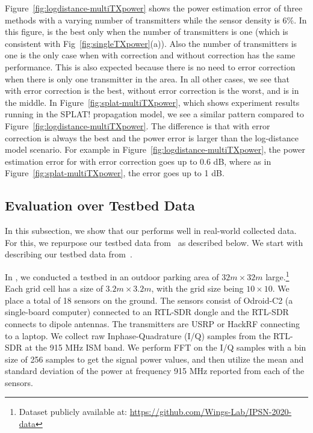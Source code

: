 Figure~\ref{fig:logdistance-multiTXpower} shows the power estimation error of three methods with a varying number of transmitters while the sensor density is 6\%.
In this figure, \map is the best only when the number of transmitters is one (which is consistent with Fig~\ref{fig:singleTXpower}(a)).
Also the number of transmitters is one is the only case when \power with correction and without correction has the same performance.
This is also expected because there is no need to error correction when there is only one transmitter in the area.
In all other cases, we see that \power with error correction is the best, \power without error correction  is the worst, and \map is in the middle.
In Figure~\ref{fig:splat-multiTXpower}, which shows experiment results running in the SPLAT! propagation model, we see a similar pattern compared to Figure~\ref{fig:logdistance-multiTXpower}.
The difference is that \power with error correction is always the best and the power error is larger than the log-distance model scenario.
For example in Figure~\ref{fig:logdistance-multiTXpower}, the power estimation error for \power with error correction goes up to 0.6 dB, where as in Figure~\ref{fig:splat-multiTXpower}, the error goes up to 1 dB.







\subsection{Evaluation over Testbed Data}
\label{subsec:ipsn}
In this subsection, we show that our \our performs well in real-world collected data.
For this, we repurpose our testbed data from~\cite{ipsn20-mtl} as described below. We start with describing our testbed data from~\cite{ipsn20-mtl}.

In \cite{ipsn20-mtl}, we conducted a testbed in an outdoor parking area of $32m\times 32m$ large.\footnote{Dataset publicly available at: \url{https://github.com/Wings-Lab/IPSN-2020-data}}
Each grid cell has a size of $3.2m \times 3.2m$, with the grid size being $10\times 10$.
We place a total of 18 sensors on the ground.
The sensors consist of Odroid-C2 (a single-board computer) connected to an RTL-SDR dongle and the RTL-SDR connects to dipole antennas.
The transmitters are USRP or HackRF connecting to a laptop.
We collect raw Inphase-Quadrature (I/Q) samples from the RTL-SDR at the 915 MHz ISM band.
We perform FFT on the I/Q samples with a bin size of 256 samples to get the signal power values, and then utilize the mean and standard deviation of the power at frequency 915 MHz reported from each of the sensors.

